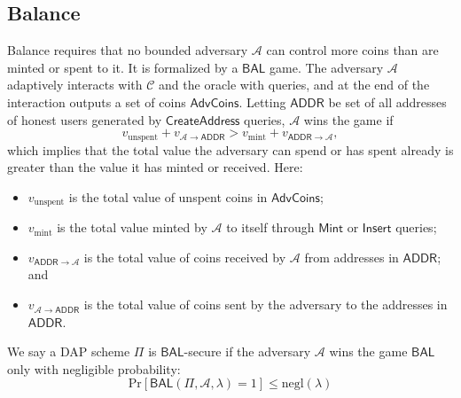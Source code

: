 \documentclass{llncs}
\newcommand{\func}[1]{\mathsf{#1}}
\begin{document}
\subsection{Balance}

Balance requires that no bounded adversary $\mathcal{A}$ can control more coins than are minted or spent to it.
It is formalized by a $\func{BAL}$ game.
The adversary $\mathcal{A}$ adaptively interacts with $\mathcal{C}$ and the oracle with queries, and at the end of the interaction outputs a set of coins $\func{AdvCoins}$.
Letting $\func{ADDR}$ be set of all addresses of honest users generated by $\func{CreateAddress}$ queries, $\mathcal{A}$ wins the game if
$$v_{\text{unspent}} + v_{\mathcal{A} \to \func{ADDR}} > v_{\text{mint}} + v_{\func{ADDR} \to \mathcal{A}},$$
which implies that the total value the adversary can spend or has spent already is greater than the value it has minted or received.
Here:
\begin{itemize}
    \item $v_{\text{unspent}}$ is the total value of unspent coins in $\func{AdvCoins}$;
    \item $v_{\text{mint}}$ is the total value minted by $\mathcal{A}$ to itself through $\func{Mint}$ or $\func{Insert}$ queries;
    \item $v_{\func{ADDR} \xrightarrow{} \mathcal{A}}$ is the total value of coins received by $\mathcal{A}$ from addresses in $\func{ADDR}$; and
    \item $v_{\mathcal{A} \xrightarrow{} \func{ADDR}}$ is the total value of coins sent by the adversary to the addresses in $\func{ADDR}$.
\end{itemize}
We say a DAP scheme $\Pi$ is $\func{BAL}$-secure if the adversary $\mathcal{A}$ wins the game $\func{BAL}$ only with negligible probability:
$$\text{Pr}[\func{BAL}(\Pi, \mathcal{A}, \lambda) = 1] \leq \text{negl}(\lambda)$$
\end{document}
